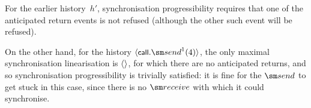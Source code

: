 
For the earlier history~$h'$, synchronisation progressibility requires that
one of the anticipated return events is not refused (although the other such
event will be refused).

On the other hand, for the history $\seq{\call.\send^1(4)}$, the only
maximal synchronisation linearisation is $\langle  \rangle$, for which there are no
anticipated returns, and so synchronisation progressibility is trivially
satisfied: it is fine for the $\send$ to get stuck in this case, since there
is no $\receive$ with which it could synchronise.

